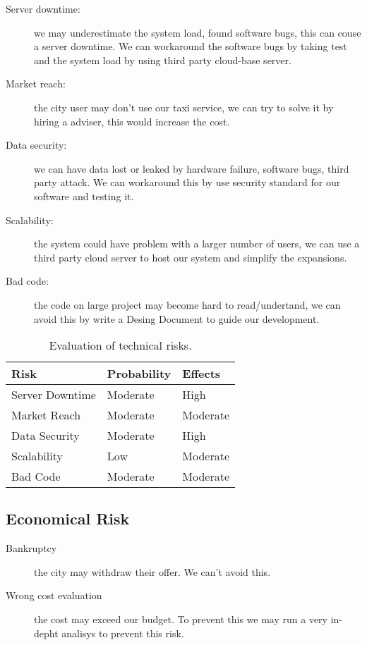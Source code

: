     \begin{description}
      \item[Server downtime:] we may underestimate the system load, found
          software bugs, this can couse a server downtime. We can workaround
          the software bugs by taking test and the system load by using third party cloud-base server.
      \item[Market reach:] the city user may don't use our taxi service, we can
          try to solve it by hiring a adviser, this would increase the cost.
      \item[Data security:] we can have data lost or leaked by hardware failure,
          software bugs, third party attack. We can workaround
          this by use security  standard for our software and testing it.
      \item[Scalability:] the system could have problem with a larger number of users, we can use a third party cloud server
          to host our system and simplify the expansions.
      \item[Bad code:] the code on large project may become hard to read/undertand, we can avoid this by
          write a Desing Document to guide our development.
    \end{description}

    \begin{table}[h]
      \centering
          \begin{tabular}{| l | l | l |}
              \hline
              \textbf{Risk} & \textbf{Probability}  & \textbf{Effects}  \\
              \hline
              Server Downtime & Moderate & High\\
              \hline
              Market Reach & Moderate & Moderate\\
              \hline
              Data Security & Moderate & High\\
              \hline
              Scalability & Low & Moderate          \\
              \hline
              Bad Code & Moderate & Moderate\\
              \hline
          \end{tabular}
        \caption{Evaluation of technical risks.}
    \end{table}
  \subsection{Economical Risk}
  \askpippo
    \begin{description}
      \item[Bankruptcy] the city may withdraw their offer. We can't avoid this.
      \item[Wrong cost evaluation] the cost may exceed our budget. To prevent this we may run a very in-depht analisys to prevent this risk.
    \end{description}

